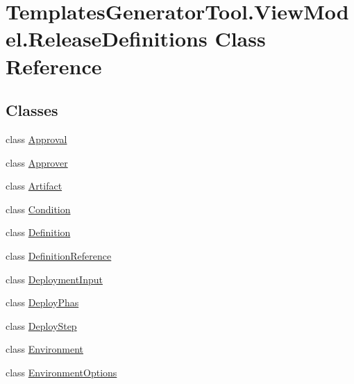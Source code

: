 \hypertarget{class_templates_generator_tool_1_1_view_model_1_1_release_definitions}{}\section{Templates\+Generator\+Tool.\+View\+Model.\+Release\+Definitions Class Reference}
\label{class_templates_generator_tool_1_1_view_model_1_1_release_definitions}
\subsection*{Classes}
\begin{DoxyCompactItemize}
\item 
class \mbox{\hyperlink{class_templates_generator_tool_1_1_view_model_1_1_release_definitions_1_1_approval}{Approval}}
\item 
class \mbox{\hyperlink{class_templates_generator_tool_1_1_view_model_1_1_release_definitions_1_1_approver}{Approver}}
\item 
class \mbox{\hyperlink{class_templates_generator_tool_1_1_view_model_1_1_release_definitions_1_1_artifact}{Artifact}}
\item 
class \mbox{\hyperlink{class_templates_generator_tool_1_1_view_model_1_1_release_definitions_1_1_condition}{Condition}}
\item 
class \mbox{\hyperlink{class_templates_generator_tool_1_1_view_model_1_1_release_definitions_1_1_definition}{Definition}}
\item 
class \mbox{\hyperlink{class_templates_generator_tool_1_1_view_model_1_1_release_definitions_1_1_definition_reference}{Definition\+Reference}}
\item 
class \mbox{\hyperlink{class_templates_generator_tool_1_1_view_model_1_1_release_definitions_1_1_deployment_input}{Deployment\+Input}}
\item 
class \mbox{\hyperlink{class_templates_generator_tool_1_1_view_model_1_1_release_definitions_1_1_deploy_phas}{Deploy\+Phas}}
\item 
class \mbox{\hyperlink{class_templates_generator_tool_1_1_view_model_1_1_release_definitions_1_1_deploy_step}{Deploy\+Step}}
\item 
class \mbox{\hyperlink{class_templates_generator_tool_1_1_view_model_1_1_release_definitions_1_1_environment}{Environment}}
\item 
class \mbox{\hyperlink{class_templates_generator_tool_1_1_view_model_1_1_release_definitions_1_1_environment_options}{Environment\+Options}}

\end{DoxyCompactItemize}
